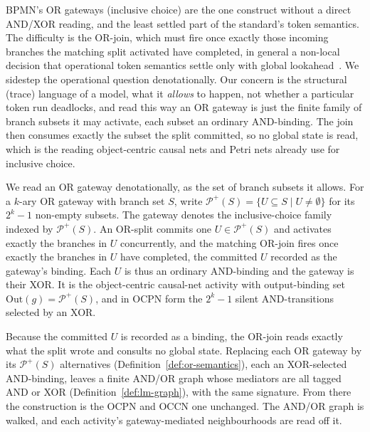 BPMN's OR gateways (inclusive choice) are the one construct without a direct AND/XOR
reading, and the least settled part of the standard's token semantics. The difficulty is the
OR-join, which must fire once exactly those incoming branches the matching split activated
have completed, in general a non-local decision that operational token semantics settle only
with global lookahead~\cite{dijkmanSemanticsAnalysisBusiness2008}. We sidestep the
operational question denotationally. Our concern is the structural (trace) language of a
model, what it \emph{allows} to happen, not whether a particular token run deadlocks, and
read this way an OR gateway is just the finite family of branch subsets it may activate,
each subset an ordinary AND-binding. The join then consumes exactly the subset the split
committed, so no global state is read, which is the reading object-centric causal nets and
Petri nets already use for inclusive choice.

\begin{definition}\label{def:or-semantics}
  We read an OR gateway denotationally, as the set of branch subsets it allows.
  For a $k$-ary OR gateway with branch set $S$, write
  $\mathcal{P}^+(S) = \{ U \subseteq S \mid U \neq \emptyset \}$ for its $2^k - 1$
  non-empty subsets. The gateway denotes the inclusive-choice family indexed by
  $\mathcal{P}^+(S)$. An OR-split commits one $U \in \mathcal{P}^+(S)$ and activates exactly the
  branches in $U$ concurrently, and the matching OR-join fires once exactly the branches in $U$ have
  completed, the committed $U$ recorded as the gateway's binding. Each $U$ is thus an ordinary
  AND-binding and the gateway is their XOR. It is the object-centric causal-net activity with
  output-binding set $\mathrm{Out}(g)=\mathcal{P}^+(S)$, and in OCPN form the $2^k-1$ silent AND-transitions
  selected by an XOR.
\end{definition}

Because the committed $U$ is recorded as a binding, the OR-join reads exactly what the split wrote
and consults no global state. Replacing each OR gateway by its $\mathcal{P}^+(S)$ alternatives
(Definition~\ref{def:or-semantics}), each an XOR-selected AND-binding, leaves a finite AND/OR graph whose mediators are all tagged AND or XOR (Definition~\ref{def:lm-graph}), with the same signature. From there the construction is the
OCPN and OCCN one unchanged. The AND/OR graph is walked, and each activity's
gateway-mediated neighbourhoods are read off it.

